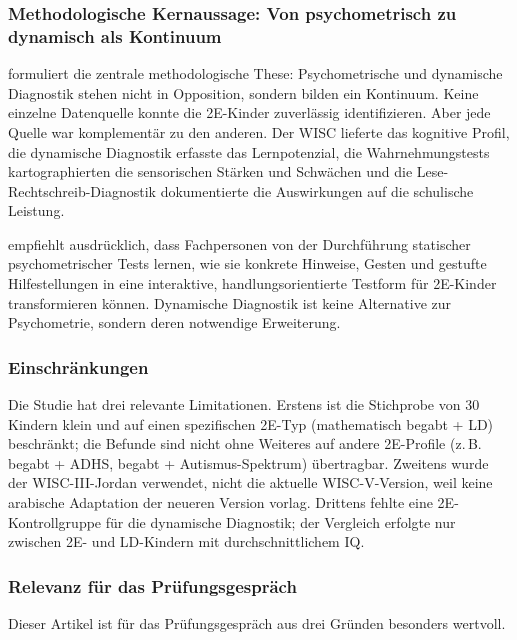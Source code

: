 \documentclass[ngerman, a4paper]{article}
\begin{document}
\subsubsection*{Methodologische Kernaussage: Von psychometrisch zu
  dynamisch als Kontinuum}

\textcite{alhroub2021utility} formuliert die zentrale methodologische These: Psychometrische
und dynamische Diagnostik stehen nicht in Opposition, sondern bilden ein
Kontinuum. Keine einzelne Datenquelle konnte die 2E-Kinder zuverlässig
identifizieren. Aber jede Quelle war komplementär zu den anderen. Der WISC
lieferte das kognitive Profil, die dynamische Diagnostik erfasste das
Lernpotenzial, die Wahrnehmungstests kartographierten die sensorischen
Stärken und Schwächen und die Lese-Rechtschreib-Diagnostik dokumentierte
die Auswirkungen auf die schulische Leistung.

\textcite{alhroub2021utility} empfiehlt ausdrücklich, dass Fachpersonen von der Durchführung
statischer psychometrischer Tests lernen, wie sie konkrete Hinweise, Gesten
und gestufte Hilfestellungen in eine interaktive, handlungsorientierte
Testform für 2E-Kinder transformieren können. Dynamische Diagnostik ist
keine Alternative zur Psychometrie, sondern deren notwendige Erweiterung.

\subsubsection*{Einschränkungen}

Die Studie hat drei relevante Limitationen. Erstens ist die Stichprobe von
30 Kindern klein und auf einen spezifischen 2E-Typ (mathematisch begabt +
LD) beschränkt; die Befunde sind nicht ohne Weiteres auf andere 2E-Profile
(z.\,B. begabt + ADHS, begabt + Autismus-Spektrum) übertragbar. Zweitens
wurde der WISC-III-Jordan verwendet, nicht die aktuelle WISC-V-Version,
weil keine arabische Adaptation der neueren Version vorlag. Drittens fehlte
eine 2E-Kontrollgruppe für die dynamische Diagnostik; der Vergleich
erfolgte nur zwischen 2E- und LD-Kindern mit durchschnittlichem IQ.

\subsubsection*{Relevanz für das Prüfungsgespräch}

Dieser Artikel ist für das Prüfungsgespräch aus drei Gründen besonders
wertvoll.
\end{document}
